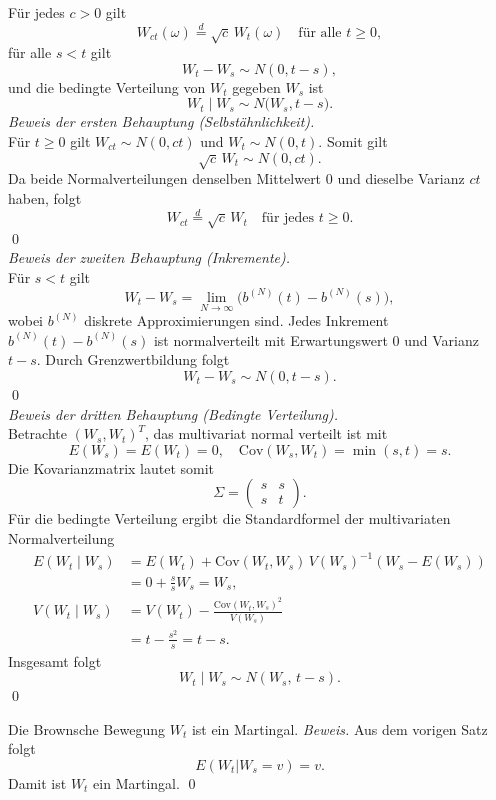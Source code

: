 \begin{satz}
Für jedes $c > 0$ gilt
$$
W_{ct}(\omega) \overset{d}{=} \sqrt{c}\, W_t(\omega) \quad \text{für alle } t \ge 0,
$$
für alle $s < t$ gilt
$$
W_t - W_s \sim N(0, t-s),
$$
und die bedingte Verteilung von $W_t$ gegeben $W_s$ ist
$$
W_t \mid W_s \sim N\big(W_s, t-s\big).
$$
\textit{Beweis der ersten Behauptung (Selbstähnlichkeit).} \\
Für $t \ge 0$ gilt $W_{ct} \sim N(0, ct)$ und $W_t \sim N(0, t)$. Somit gilt
$$
\sqrt{c}\, W_t \sim N(0, c t).
$$
Da beide Normalverteilungen denselben Mittelwert $0$ und dieselbe Varianz $ct$ haben, folgt
$$
W_{ct} \stackrel{d}{=} \sqrt{c}\, W_t \quad \text{für jedes } t \ge 0.
$$  
\qed  \\
\textit{Beweis der zweiten Behauptung (Inkremente).} \\
Für $s < t$ gilt
$$
W_t - W_s = \lim_{N \to \infty} \big( b^{(N)}(t) - b^{(N)}(s) \big),
$$
wobei $b^{(N)}$ diskrete Approximierungen sind. Jedes Inkrement $b^{(N)}(t) - b^{(N)}(s)$ ist normalverteilt mit Erwartungswert $0$ und Varianz $t-s$. Durch Grenzwertbildung folgt
$$
W_t - W_s \sim N(0, t-s).
$$
\qed  \\
\textit{Beweis der dritten Behauptung (Bedingte Verteilung).} \\
Betrachte $(W_s, W_t)^T$, das multivariat normal verteilt ist mit
$$
E(W_s) = E(W_t) = 0, \quad
\mathrm{Cov}(W_s, W_t) = \min(s, t) = s.
$$  
Die Kovarianzmatrix lautet somit
$$
\Sigma = \begin{pmatrix} s & s \\ s & t \end{pmatrix}.
$$
Für die bedingte Verteilung ergibt die Standardformel der multivariaten Normalverteilung
$$
\begin{aligned}
E(W_t \mid W_s) &= E(W_t) + \mathrm{Cov}(W_t, W_s)\,V(W_s)^{-1} (W_s - E(W_s)) \\
&= 0 + \frac{s}{s} W_s = W_s, \\
V(W_t \mid W_s) &= V(W_t) - \frac{\mathrm{Cov}(W_t, W_s)^2}{V(W_s)} \\
&= t - \frac{s^2}{s} = t - s.
\end{aligned}
$$
Insgesamt folgt
$$
W_t \mid W_s \sim N(W_s,\, t-s).
$$ \qed
\end{satz}

\begin{korr}
Die Brownsche Bewegung $W_t$ ist ein Martingal.
\textit{Beweis.} Aus dem vorigen Satz folgt
$$
E(W_t | W_s = v) = v.
$$
Damit ist $W_t$ ein Martingal. \qed
\end{korr}  

